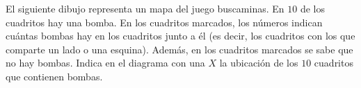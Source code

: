 El siguiente dibujo representa un mapa del juego buscaminas. En $10$ de los cuadritos hay una bomba. En los cuadritos marcados, los números indican cuántas bombas hay en los cuadritos junto a él (es decir, los cuadritos con los que comparte un lado o una esquina). Además, en los cuadritos marcados se sabe que no hay bombas. Indica en el diagrama con una $X$ la ubicación de los $10$ cuadritos que contienen bombas.
